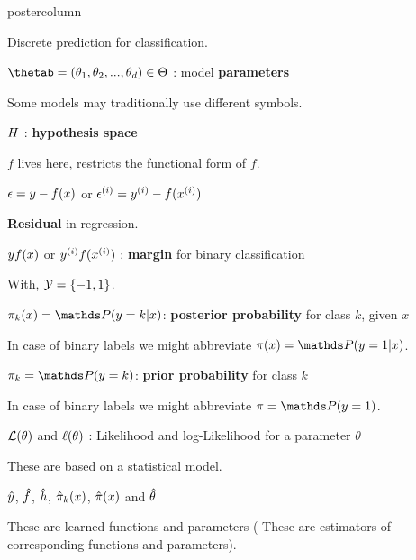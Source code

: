 \documentclass{beamer}
\begin{document}
\begin{frame}[fragile]{}
\begin{columns}
\begin{column}{.31\textwidth}
\begin{beamercolorbox}[center]{postercolumn}
\begin{minipage}{.98\textwidth}
{\begin{myblock}{}
						\hspace*{1ex}Discrete prediction for classification.
						\\
						\begin{codebox}
							$\thetab = (\theta_1, \theta_2, ..., \theta_d) \in \Theta$ : model \textbf{parameters}
						\end{codebox}
						\hspace*{1ex}Some models may traditionally use different symbols.
						\\
						\begin{codebox}
							$H$ : \textbf{hypothesis space}
						\end{codebox}
						\hspace*{1ex}$f$ lives here, restricts the functional form of $f$.
						\\
						\begin{codebox}
				            $\epsilon = y - f(x)$ or $\epsilon^{(i)} = y^{(i)} - f(x^{(i)})$
						\end{codebox}
						\hspace*{1ex}\textbf{Residual} in regression.
						\\
						\begin{codebox}
				             $y f(x)$ or $y^{(i)} f(x^{(i)})$ : \textbf{margin} for binary classification
						\end{codebox}
						\hspace*{1ex}With, $\mathcal{Y} = \{-1, 1\}$.
						\\
						\begin{codebox} $\pikx = \postk$: \textbf{posterior probability} for class $k$, given $x$
						\end{codebox}
						\hspace*{1ex}In case of binary labels we might abbreviate $\pix = \post$.
						\\
						\begin{codebox}
						$\pi_k = \P(y = k)$:\textbf{ prior probability} for class $k$
						\end{codebox}
						\hspace*{1ex}In case of binary labels we might abbreviate $\pi = \P(y = 1)$.
						\\
						\begin{codebox}
						$\mathcal{L}(\theta)$ and $\ell(\theta)$ : Likelihood and log-Likelihood for a parameter $\theta$
						\end{codebox}
						\hspace*{1ex}These are based on a statistical model.
						\\
						\begin{codebox}
						 $\hat{y}$, $\hat{f}$, $\hat{h}$, $\hat \pi_k(x)$, $\hat \pi(x)$ and $\hat{\theta}$
						\end{codebox}
						\hspace*{1ex}These are learned functions and parameters ( These are estimators of \hspace*{1ex}corresponding functions and parameters).\\
						

\end{myblock}}
\end{minipage}
\end{beamercolorbox}
\end{column}
\end{columns}
\end{frame}
\end{document}

